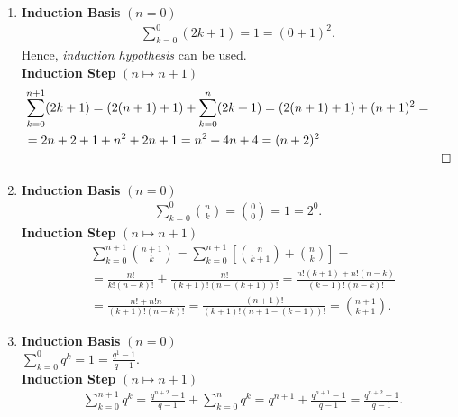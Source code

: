 {\color{solution}
\begin{enumerate}
	\item \textbf{Induction Basis} $(n=0)$\\
	\begin{align*}
	\sum_{k=0}^{0}(2k+1) = 1 = (0+1)^2.
	\end{align*}
	Hence, \textit{induction hypothesis} can be used.\\
	\textbf{Induction Step} $(n \mapsto n+1)$\\
	\begin{align*}
	&\sum_{k=0}^{n+1}(2k+1)  = (2(n+1) + 1) + \sum_{k=0}^{n}(2k+1) 
	= (2(n+1) + 1) + (n+1)^2 = \\
	&=2n + 2 + 1 + n^2 + 2n + 1 = n^2 + 4n + 4 = (n+2)^2\\
	&&\hfill \square
	\end{align*}
	\item \textbf{Induction Basis } $(n=0)$\\
	\begin{align*}
	\sum_{k=0}^{0} \binom{n}{k} = \binom{0}{0} = 1 = 2^0.
	\end{align*}	
	\textbf{Induction Step} $(n \mapsto n+1)$\\
	\begin{align*}
	&\sum_{k=0}^{n+1} \binom{n+1}{k} = \sum_{k=0}^{n+1} \left[\binom{n}{k+1} + \binom{n}{k}\right] =\\
	&= \frac{n!}{k!(n-k)!} + \frac{n!}{(k+1)!(n-(k+1))!} = \frac{n!(k+1) + n!(n-k)}{(k+1)!(n-k)!}\\
	&=\frac{n! + n!n}{(k+1)!(n-k)!} = \frac{(n+1)!}{(k+1)!(n+1-(k+1))!} = \binom{n+1}{k+1}.
	\end{align*}
	\item \textbf{Induction Basis } $(n=0)$\\
	$\sum_{k=0}^{0} q^k = 1  = \frac{q^{1} - 1}{q -1}.	$\\
	\textbf{Induction Step} $(n \mapsto n+1)$\\
	\begin{align*}
	&\sum_{k=0}^{n+1} q^k  = \frac{q^{n+2} - 1}{q -1} +  \sum_{k=0}^{n} q^k  = q^{n+1} + \frac{q^{n+1} - 1}{q -1}=
	\frac{q^{n+2} - 1}{q -1} .
	\end{align*}
\end{enumerate}
}